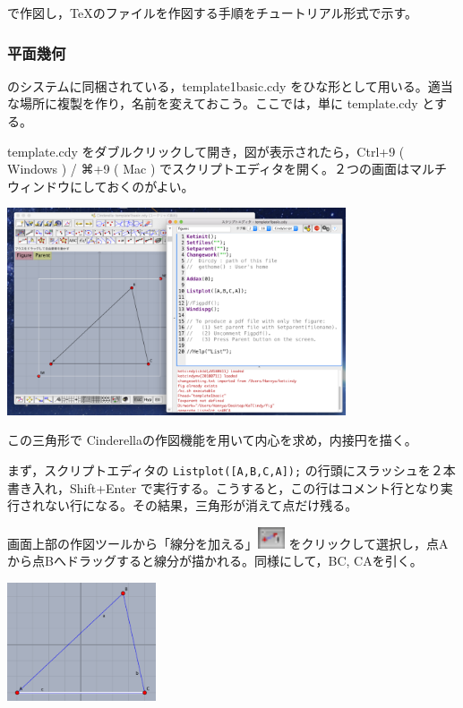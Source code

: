 \documentclass[papersize,a4paper,12pt,uplatex]{jsarticle}
\begin{document}
\ketcindy で作図し，TeXのファイルを作図する手順をチュートリアル形式で示す。

\subsubsection{平面幾何}

\ketcindy のシステムに同梱されている，template1basic.cdy をひな形として用いる。適当な場所に複製を作り，名前を変えておこう。ここでは，単に template.cdy とする。

template.cdy をダブルクリックして開き，図が表示されたら，Ctrl+9 ( Windows )  / ⌘+9 ( Mac ) でスクリプトエディタを開く。２つの画面はマルチウィンドウにしておくのがよい。

\vspace{\baselineskip}
\begin{center}\includegraphics[bb=0.00 0.00 500.03 306.52,width=10cm]{Fig/start01.pdf}\end{center}

この三角形で Cinderellaの作図機能を用いて内心を求め，内接円を描く。

まず，スクリプトエディタの \verb|Listplot([A,B,C,A]);|  の行頭にスラッシュを２本書き入れ，Shift+Enter で実行する。こうすると，この行はコメント行となり実行されない行になる。その結果，三角形が消えて点だけ残る。

画面上部の作図ツールから「線分を加える」\includegraphics[bb=0.00 0.00 6.48 5.04,width=8mm]{Fig/segment.pdf} をクリックして選択し，点Aから点Bへドラッグすると線分が描かれる。同様にして，BC, CAを引く。

\begin{center}\includegraphics[bb=0.00 0.00 414.02 329.02,height=3.5cm]{Fig/start02.pdf} \end{center}
\end{document}
